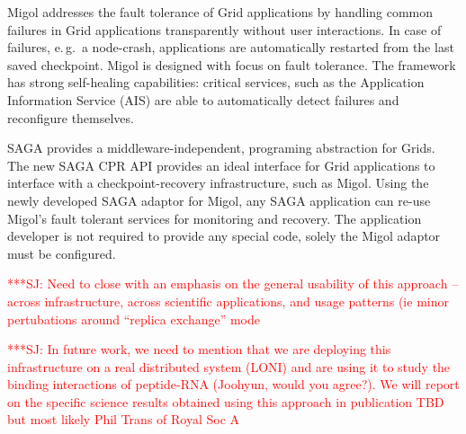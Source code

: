 \documentclass[times, 10pt,twocolumn]{article}
\newcommand{\jhanote}[1]{ {\textcolor{red} { ***SJ: #1 }}}
\begin{document}

Migol addresses the fault tolerance of Grid applications by handling common failures 
in Grid applications transparently without user interactions.  In case of failures, 
e.\,g.\ a node-crash, applications are automatically restarted 
from the last saved checkpoint.   
Migol is designed with focus on fault tolerance. 
The framework has strong self-healing capabilities: critical services, 
such as the Application Information Service (AIS) are
able to automatically detect failures and reconfigure themselves. 

SAGA provides a middleware-independent, programing abstraction for Grids. The new 
SAGA CPR API provides an ideal interface for Grid applications to interface with 
a checkpoint-recovery infrastructure, such as Migol. Using the newly developed SAGA adaptor for 
Migol, any SAGA application can re-use Migol's fault tolerant services for monitoring and recovery.
The application developer is not required to provide any special code, solely the Migol adaptor must be
configured.

\jhanote{Need to close with an emphasis on the general usability of
  this approach -- across infrastructure, across scientific
  applications, and usage patterns (ie minor pertubations around
  ``replica exchange'' mode}

\jhanote{In future work, we need to mention that we are deploying this
  infrastructure on a real distributed system (LONI) and are using it
  to study the binding interactions of peptide-RNA (Joohyun, would you
  agree?). We will report on the specific science results obtained
  using this approach in publication TBD but most likely Phil Trans of
  Royal Soc A}



\end{document}

